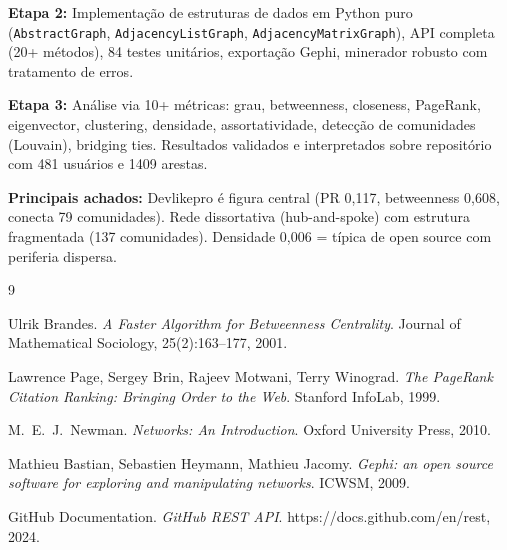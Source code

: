 \documentclass[12pt,a4paper]{article}
\begin{document}
\textbf{Etapa 2:} Implementação de estruturas de dados em Python puro (\texttt{AbstractGraph}, \texttt{AdjacencyListGraph}, \texttt{AdjacencyMatrixGraph}), API completa (20+ métodos), 84 testes unitários, exportação Gephi, minerador robusto com tratamento de erros.

\textbf{Etapa 3:} Análise via 10+ métricas: grau, betweenness, closeness, PageRank, eigenvector, clustering, densidade, assortatividade, detecção de comunidades (Louvain), bridging ties. Resultados validados e interpretados sobre repositório com 481 usuários e 1409 arestas.

\textbf{Principais achados:} Devlikepro é figura central (PR 0,117, betweenness 0,608, conecta 79 comunidades). Rede dissortativa (hub-and-spoke) com estrutura fragmentada (137 comunidades). Densidade 0,006 = típica de open source com periferia dispersa.

\begin{thebibliography}{9}

  Ulrik Brandes.
  \textit{A Faster Algorithm for Betweenness Centrality}.
  Journal of Mathematical Sociology, 25(2):163--177, 2001.

  Lawrence Page, Sergey Brin, Rajeev Motwani, Terry Winograd.
  \textit{The PageRank Citation Ranking: Bringing Order to the Web}.
  Stanford InfoLab, 1999.

  M.\ E.\ J.\ Newman.
  \textit{Networks: An Introduction}.
  Oxford University Press, 2010.

  Mathieu Bastian, Sebastien Heymann, Mathieu Jacomy.
  \textit{Gephi: an open source software for exploring and manipulating networks}.
  ICWSM, 2009.

  GitHub Documentation.
  \textit{GitHub REST API}.
  https://docs.github.com/en/rest, 2024.

\end{thebibliography}
\end{document}
